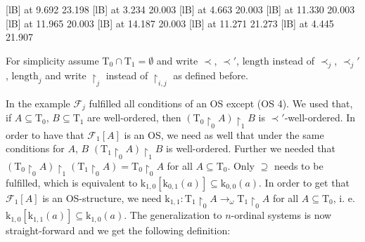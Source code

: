 \documentclass[10pt]{article}
\def\condition#1{\indent \hbox to 2.0cm{$(#1)$\hfill}}
\def\ar{\rightarrow}
\def\length{\mathrm{length}}
\def\k{\mathrm{k}}
\def\OS{{\mathrm{OS}}}
\def\T{\mathrm{T}}
\def\calF{\mathcal{F}}
\begin{document}
{ [lB] at  9.692 23.198
%
%
 [lB] at  3.234 20.003
%
%
 [lB] at  4.663 20.003
%
%
 [lB] at 11.330 20.003
%
%
 [lB] at 11.965 20.003
%
%
 [lB] at 14.187 20.003
%
%
 [lB] at 11.271 21.273
%
%
 [lB] at  4.445 21.907
\linethickness=0pt
\endpicture}

%
%
%
\noindent For simplicity assume $\T_0 \cap \T_1 = \emptyset$ and write 
$\prec$, $\prec '$, $\length$  instead of $\prec_j$, $\prec_j'$,
$\length_j$ and write $\restriction_j$ instead of $\restriction_{i,j}$ as
defined before.\par 
In the example $\calF_j$ fulfilled all conditions of an OS except (OS 4). 
We used that, if $A \subseteq \T_0$,
$B \subseteq \T_1$ are well-ordered, then
$(\T_0 \restriction_0 A) \restriction_1 B$
is $\prec '$-well-ordered. 
In order to have that $\calF_1[A]$ is
an OS, we need as well that under the same conditions for
$A$, $B$ $(\T_1 \restriction_0 A) \restriction_1 B$ is well-ordered.
Further we needed that  $(\T_0 \restriction_0 A) \restriction_1
(\T_1 \restriction_0 A) = \T_0 \restriction_0 A$ for 
all $A \subseteq \T_0$. 
Only $\supseteq$ needs to be fulfilled, which is equivalent to
$\k_{1,0}[\k_{0,1}(a)] \subseteq \k_{0,0}(a)$.
In order to get that $\calF_1[A]$ is an OS-structure,
we need $\k_{1,1}: \T_1 \restriction_0 A \ar_\omega \T_1 \restriction_0 A$
for all $A \subseteq \T_0$, 
i. e. $\k_{1,0}[\k_{1,1}(a)] \subseteq \k_{1,0}(a)$.
The  generalization to $n$-ordinal systems is now straight-forward  and we
get  the following definition: 
%
%
%
\end{document}
